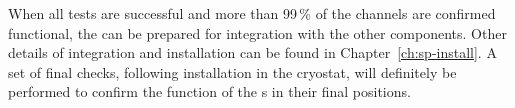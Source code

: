 
When all tests are successful and more than \num{99}\,\% of the channels are confirmed functional,
 the  can be prepared for integration with the other components.  Other details of integration and installation can be found in Chapter~\ref{ch:sp-install}.  A set of final checks, following installation in the cryostat, will definitely be performed to confirm the function of the s in their final positions.

